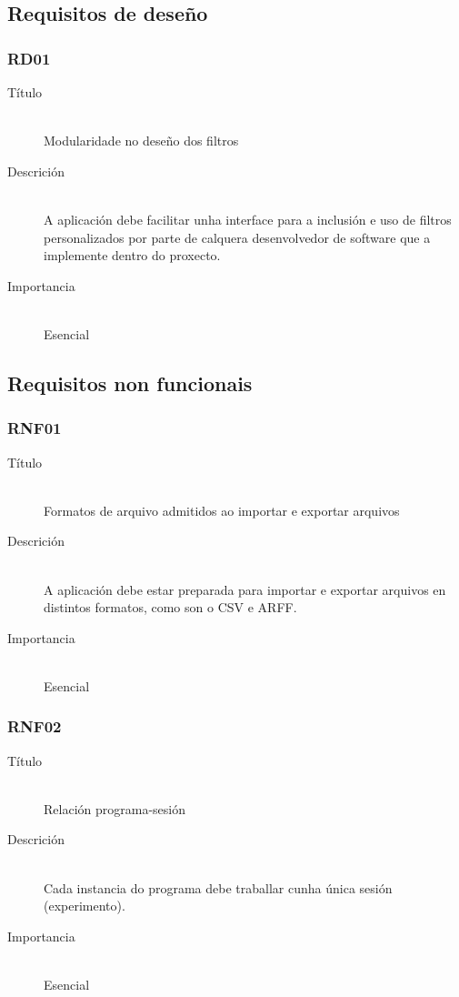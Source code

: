 \subsection{Requisitos de deseño}

\subsubsection*{RD01}
\begin{description}
\item[Título] \hfill \\
Modularidade no deseño dos filtros
\item[Descrición] \hfill \\
A aplicación debe facilitar unha interface para a inclusión e uso de filtros personalizados por parte de calquera desenvolvedor de software que a implemente dentro do proxecto.
\item[Importancia] \hfill \\
Esencial
\end{description}

\subsection{Requisitos non funcionais}

\subsubsection*{RNF01}
\begin{description}
\item[Título] \hfill \\
Formatos de arquivo admitidos ao importar e exportar arquivos
\item[Descrición] \hfill \\
A aplicación debe estar preparada para importar e exportar arquivos en distintos formatos, como son o CSV e ARFF.
\item[Importancia] \hfill \\
Esencial
\end{description}

\subsubsection*{RNF02}
\begin{description}
\item[Título] \hfill \\
Relación programa-sesión
\item[Descrición] \hfill \\
Cada instancia do programa debe traballar cunha única sesión (experimento).
\item[Importancia] \hfill \\
Esencial
\end{description}

